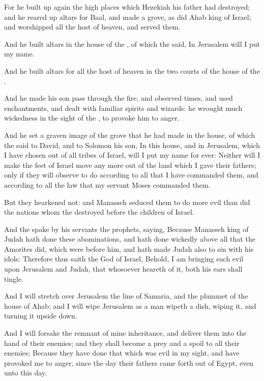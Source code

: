 \verse For he built up again the high places which Hezekiah his father had destroyed; and he reared up altars for Baal, and made a grove, as did Ahab king of Israel; and worshipped all the host of heaven, and served them.

\verse And he built altars in the house of the \LORD, of which the \LORD said, In Jerusalem will I put my name.

\verse And he built altars for all the host of heaven in the two courts of the house of the \LORD.

\verse And he made his son pass through the fire, and observed times, and used enchantments, and dealt with familiar spirits and wizards: he wrought much wickedness in the sight of the \LORD, to provoke him to anger.

\verse And he set a graven image of the grove that he had made in the house, of which the \LORD said to David, and to Solomon his son, In this house, and in Jerusalem, which I have chosen out of all tribes of Israel, will I put my name for ever: \verse Neither will I make the feet of Israel move any more out of the land which I gave their fathers; only if they will observe to do according to all that I have commanded them, and according to all the law that my servant Moses commanded them.

\verse But they hearkened not: and Manasseh seduced them to do more evil than did the nations whom the \LORD destroyed before the children of Israel.

\verse And the \LORD spake by his servants the prophets, saying, \verse Because Manasseh king of Judah hath done these abominations, and hath done wickedly above all that the Amorites did, which were before him, and hath made Judah also to sin with his idols: \verse Therefore thus saith the \LORD God of Israel, Behold, I am bringing such evil upon Jerusalem and Judah, that whosoever heareth of it, both his ears shall tingle.

\verse And I will stretch over Jerusalem the line of Samaria, and the plummet of the house of Ahab: and I will wipe Jerusalem as a man wipeth a dish, wiping it, and turning it upside down.

\verse And I will forsake the remnant of mine inheritance, and deliver them into the hand of their enemies; and they shall become a prey and a spoil to all their enemies; \verse Because they have done that which was evil in my sight, and have provoked me to anger, since the day their fathers came forth out of Egypt, even unto this day.

